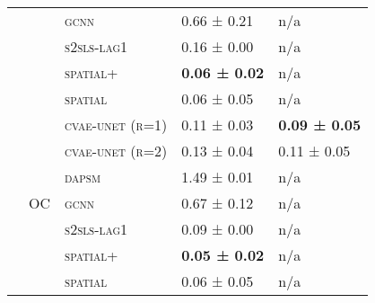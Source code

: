 \documentclass{article}
\begin{document}
\begin{table}[!tbp]
\begin{tabular}{lllll}
 &  & \textsc{gcnn} & 0.66 ± {\small 0.21} & n/a \\
 &  & \textsc{s2sls-lag1} & 0.16 ± {\small 0.00} & n/a \\
 &  & \textsc{spatial+} & \bf 0.06 ± {\small 0.02} & n/a \\
 &  & \textsc{spatial} & 0.06 ± {\small 0.05} & n/a \\
\cline{2-5}
 & \multirow[t]{7}{*}{OC} & \textsc{cvae-unet (r=1)} & 0.11 ± {\small 0.03} & \bf 0.09 ± {\small 0.05} \\
 &  & \textsc{cvae-unet (r=2)} & 0.13 ± {\small 0.04} & 0.11 ± {\small 0.05} \\
 &  & \textsc{dapsm} & 1.49 ± {\small 0.01} & n/a \\
 &  & \textsc{gcnn} & 0.67 ± {\small 0.12} & n/a \\
 &  & \textsc{s2sls-lag1} & 0.09 ± {\small 0.00} & n/a \\
 &  & \textsc{spatial+} & \bf 0.05 ± {\small 0.02} & n/a \\
 &  & \textsc{spatial} & 0.06 ± {\small 0.05} & n/a \\
\cline{1-5} \cline{2-5}
\bottomrule
\end{tabular}

\end{table}
\end{document}
